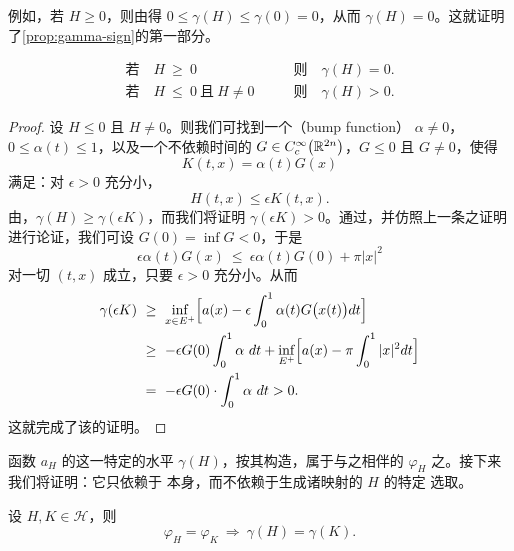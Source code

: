 例如，若 $H\geq0$，则由\trMonotonicity{}得 $0\leq\gamma(H)\leq\gamma(0)=0$，从而%
$\gamma(H)=0$。这就证明了\cref{prop:gamma-sign}的第一部分。

\begin{proposition}\label{prop:gamma-sign}
\begin{align*}
\text{若}\quad H\ \geq\ 0\qquad&\text{则}\quad\gamma(H)=0.\\
\text{若}\quad H\ \leq\ 0\ \text{且}\ H\neq0\qquad&\text{则}\quad\gamma(H)>0.
\end{align*}
\end{proposition}

\begin{proof}
设 $H\leq0$ 且 $H\neq0$。则我们可找到一个\textbf{\trBumpFunction}（bump function）%
$\alpha\neq0$，$0\leq\alpha(t)\leq1$，以及一个不依赖时间的%
$G\in C^{\infty}_{c}\bigl(\mathbb{R}^{2n}\bigr)$，$G\leq0$ 且 $G\neq0$，使得
\[
K(t,x)=\alpha(t)G(x)
\]
满足：对 $\epsilon>0$ 充分小，
\[
H(t,x)\leq\epsilon K(t,x).
\]
由\trMonotonicity，$\gamma(H)\geq\gamma(\epsilon K)$，而我们将证明%
$\gamma(\epsilon K)>0$。通过\trTranslation，并仿照上一条\trhProposition{}之证明%
进行论证，我们可设 $G(0)=\inf G<0$，于是
\[
\epsilon\alpha(t)G(x)\ \leq\ \epsilon\alpha(t)G(0)+\pi|x|^{2}
\]
对一切 $(t,x)$ 成立，只要 $\epsilon>0$ 充分小。从而
\begin{align*}
\gamma(\epsilon K)\ &\geq\ \inf_{x\in E^{+}}\Bigl[a(x)-\epsilon\int_{0}^{1}\alpha(t)G\bigl(x(t)\bigr)dt\Bigr]\\
&\geq\ -\epsilon G(0)\int_{0}^{1}\alpha\ dt+\inf_{E^{+}}\Bigl[a(x)-\pi\int_{0}^{1}|x|^{2}dt\Bigr]\\
&=\ -\epsilon G(0)\cdot\int_{0}^{1}\alpha\ dt>0.
\end{align*}
这就完成了该\trhProposition{}的证明。
\end{proof}

函数 $a_{H}$ 的这一特定的\trCritical{}水平 $\gamma(H)$，按其构造，属于与之相伴的%
\trTimeOneMap{} $\varphi_{H}$ 之\trActionSpectrum。接下来我们将证明：它只依赖于%
\trTimeOneMap{}本身，而不依赖于生成诸映射的\trHamiltonianFunction{} $H$ 的特定%
选取。

\begin{proposition}\label{prop:gamma-well-defined}
设 $H,K\in\mathcal{H}$，则
\[
\varphi_{H}=\varphi_{K}\ \Rightarrow\ \gamma(H)=\gamma(K).
\]
\end{proposition}

